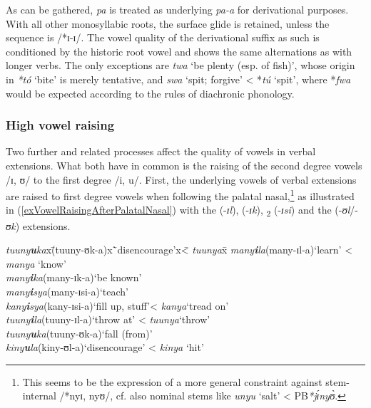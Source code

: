 As can be gathered, \textit{pa} is treated as underlying \textit{pa-a} for derivational purposes. With all other monosyllabic roots, the surface glide is retained, unless the sequence is /*ɪ-ɪ/. The vowel quality of the derivational suffix as such is conditioned by the historic root vowel and shows the same alternations as with longer verbs. The only exceptions are \textit{twa} `be plenty (esp. of fish)', whose origin in \textit{*tó} `bite' is merely tentative, and \textit{swa} \lq spit; forgive' < *\textit{tú} \lq spit', where *\textit{fwa} would be expected according to the rules of diachronic phonology.
\subsubsection{High vowel raising}\label{HighVowelRaising}
Two further and related processes affect the quality of vowels in verbal extensions. What both have in common is the raising of the second degree vowels /ɪ, ʊ/ to the first degree /i, u/. First, the underlying vowels of verbal extensions are raised to first degree vowels when following the palatal nasal,\footnote{This seems to be the expression of a more general constraint against stem-internal /*nyɪ, nyʊ/, cf. also nominal stems like \textit{unyu} \lq salt' < PB\textit{*jɪ́nyʊ̀}.} as illustrated in (\ref{exVowelRaisingAfterPalatalNasal}) with the  (-\textit{ɪl}),  (-\textit{ɪk}), \textsubscript{2} (-\textit{ɪsi}) and the  (-\textit{ʊl}/-\textit{ʊk}) extensions.

\begin{exe}
\ex \label{exVowelRaisingAfterPalatalNasal}
\begin{tabbing}
\textit{tuuny\textbf{u}ka}x\=(\degree tuuny-ʊk-a)x\=`disencourage'x\= < \textit{tuunya}x\=\kill
\textit{many\textbf{i}la}\>(\degree many-ɪl-a)\>`learn'\> < \textit{manya} \lq know'\\
\textit{many\textbf{i}ka}\>(\degree many-ɪk-a)\>`be known'\\
\textit{many\textbf{i}sya}\>(\degree many-ɪsi-a)\>`teach'\\
\textit{kany\textbf{i}sya}\>(\degree kany-ɪsi-a)\>`fill up, stuff'\>< \textit{kanya}\>`tread on'\\
\textit{tuuny\textbf{i}la}\>(\degree tuuny-ɪl-a)\>`throw at'\> < \textit{tuunya}\>`throw'\\
\textit{tuuny\textbf{u}ka}\>(\degree tuuny-ʊk-a)\>`fall (from)'\\
\textit{kiny\textbf{u}la}\>(\degree kiny-ʊl-a)\>`disencourage'\> < \textit{kinya} \>`hit'
\end{tabbing}
\end{exe}

